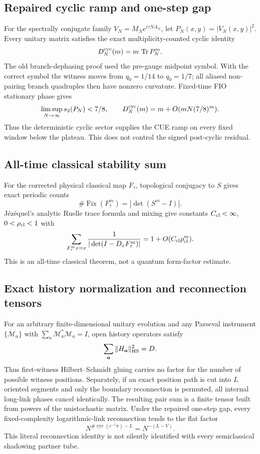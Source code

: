 \subsection{Repaired cyclic ramp and one-step gap}
For the spectrally conjugate family $V_N=M_Ne^{i\tau N A_N}$, let
$P_N(x,y)=|V_N(x,y)|^2$.  Every unitary matrix satisfies the exact
multiplicity-counted cyclic identity
\[
 D_N^{\rm cyc}(m)=m\,\operatorname{Tr}P_N^m.
\]
The old branch-dephasing proof used the pre-gauge midpoint symbol.  With the
correct symbol the witness moves from $q_0=1/14$ to $q_0=1/7$; all aliased
non-pairing branch quadruples then have nonzero curvature.  Fixed-time FIO
stationary phase gives
\[
 \limsup_{N\to\infty}s_2(P_N)<7/8,
 \qquad
 D_N^{\rm cyc}(m)=m+O(mN(7/8)^m).
\]
Thus the deterministic cyclic sector supplies the CUE ramp on every fixed
window below the plateau.  This does not control the signed post-cyclic
residual.

\subsection{All-time classical stability sum}
For the corrected physical classical map $F_\tau$, topological conjugacy to
$S$ gives exact periodic counts
\[
 \#\operatorname{Fix}(F_\tau^m)=|\det(S^m-I)|.
\]
J\'ez\'equel's analytic Ruelle trace formula and mixing give constants
$C_{\rm cl}<\infty$, $0<\rho_{\rm cl}<1$ with
\[
 \sum_{F_\tau^m x=x}{1\over|\det(I-D_xF_\tau^m)|}
 =1+O(C_{\rm cl}\rho_{\rm cl}^m).
\]
This is an all-time classical theorem, not a quantum form-factor estimate.

\subsection{Exact history normalization and reconnection tensors}
For an arbitrary finite-dimensional unitary evolution and any Parseval
instrument $\{\mathcal M_a\}$ with
$\sum_a\mathcal M_a^*\mathcal M_a=I$, open history operators satisfy
\[
 \sum_{\boldsymbol a}\|H_{\boldsymbol a}\|_{\rm HS}^2=D.
\]
Thus first-witness Hilbert--Schmidt gluing carries no factor for the number
of possible witness positions.  Separately, if an exact position path is
cut into $L$ oriented segments and only the boundary reconnection is
permuted, all internal long-link phases cancel identically.  The resulting
pair sum is a finite tensor built from powers of the unistochastic matrix.
Under the repaired one-step gap, every fixed-complexity logarithmic-link
reconnection tends to the flat factor
\[
 N^{\#\operatorname{cyc}(c^{-1}\pi)-L}=N^{-(L-V)}.
\]
This literal reconnection identity is not silently identified with every
semiclassical shadowing partner tube.

